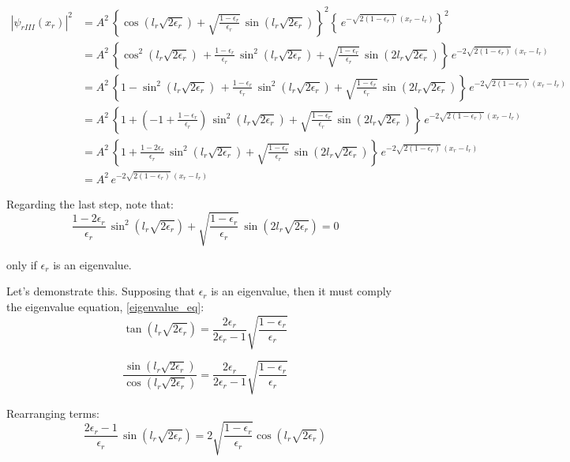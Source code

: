 \begin{align*}
\left|\psi_{rIII}(x_r)\right|^2
&= A^2\,\left\lbrace\cos\left(l_r\sqrt{2\epsilon_r}\right)
  + \sqrt{\frac{1-\epsilon_r}{\epsilon_r}}\,
    \sin\left(l_r\sqrt{2\epsilon_r}\right)
\right\rbrace^2
\left\lbrace
\,e^{-\sqrt{2(1-\epsilon_r)}\,(x_r-l_r)}
\right\rbrace^2\\
&= A^2\,\left\lbrace
 \cos^2\left(l_r\sqrt{2\epsilon_r}\right)\,
 + \frac{1-\epsilon_r}{\epsilon_r}\,\sin^2\left(l_r\sqrt{2\epsilon_r}\right)
 + \sqrt{\frac{1-\epsilon_r}{\epsilon_r}}\,
 \sin\left(2l_r\sqrt{2\epsilon_r}\right)
\right\rbrace
\,e^{-2\sqrt{2(1-\epsilon_r)}\,(x_r-l_r)}\\
&= A^2\,\left\lbrace
 1 - \sin^2\left(l_r\sqrt{2\epsilon_r}\right)\,
 + \frac{1-\epsilon_r}{\epsilon_r}\,\sin^2\left(l_r\sqrt{2\epsilon_r}\right)
 + \sqrt{\frac{1-\epsilon_r}{\epsilon_r}}\,
 \sin\left(2l_r\sqrt{2\epsilon_r}\right)
\right\rbrace
\,e^{-2\sqrt{2(1-\epsilon_r)}\,(x_r-l_r)}\\
&= A^2\,\left\lbrace
 1 
 + \left(-1+\frac{1-\epsilon_r}{\epsilon_r}\right)\,\sin^2\left(l_r\sqrt{2\epsilon_r}\right)
 + \sqrt{\frac{1-\epsilon_r}{\epsilon_r}}\,
 \sin\left(2l_r\sqrt{2\epsilon_r}\right)
\right\rbrace
\,e^{-2\sqrt{2(1-\epsilon_r)}\,(x_r-l_r)}\\
&= A^2\,\left\lbrace
 1 
 + \frac{1-2\epsilon_r}{\epsilon_r}\,\sin^2\left(l_r\sqrt{2\epsilon_r}\right)
 + \sqrt{\frac{1-\epsilon_r}{\epsilon_r}}\,
 \sin\left(2l_r\sqrt{2\epsilon_r}\right)
\right\rbrace
\,e^{-2\sqrt{2(1-\epsilon_r)}\,(x_r-l_r)}\\
&= A^2\,e^{-2\sqrt{2(1-\epsilon_r)}\,(x_r-l_r)}
\end{align*}

Regarding the last step, note that:
\[
 \frac{1-2\epsilon_r}{\epsilon_r}\,\sin^2\left(l_r\sqrt{2\epsilon_r}\right)
 + \sqrt{\frac{1-\epsilon_r}{\epsilon_r}}\,
 \sin\left(2l_r\sqrt{2\epsilon_r}\right) = 0
\]

only if $\epsilon_r$ is an eigenvalue.

Let's demonstrate this. Supposing that $\epsilon_r$ is an eigenvalue, then
it must comply the eigenvalue equation, \ref{eigenvalue_eq}:
\[
\tan\left(l_r\sqrt{2\epsilon_r}\right)
=
\frac{2\epsilon_r}{2\epsilon_r-1}
\sqrt{\frac{1-\epsilon_r}{\epsilon_r}}
\]

\[
\frac{\sin\left(l_r\sqrt{2\epsilon_r}\right)}
{\cos\left(l_r\sqrt{2\epsilon_r}\right)}
=
\frac{2\epsilon_r}{2\epsilon_r-1}
\sqrt{\frac{1-\epsilon_r}{\epsilon_r}}
\]

Rearranging terms:
\[
\frac{2\epsilon_r-1}{\epsilon_r}\,
\sin\left(l_r\sqrt{2\epsilon_r}\right)
=
2\sqrt{\frac{1-\epsilon_r}{\epsilon_r}}
\cos\left(l_r\sqrt{2\epsilon_r}\right)
\]

